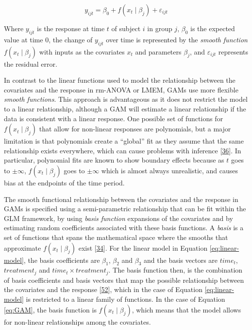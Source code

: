 \documentclass[
]{article}
\begin{document}
\begin{equation}
  y_{ijt}=\beta_0+f(x_t\mid \beta_j)+\varepsilon_{ijt}
  \label{eq:GAM}
\end{equation}

Where \(y_{ijt}\) is the response at time \(t\) of subject \(i\) in group \(j\), \(\beta_0\) is the expected value at time 0, the change of \(y_{ijt}\) over time is represented by the \emph{smooth function} \(f(x_t\mid \beta_j)\) with inputs as the covariates \(x_t\) and parameters \(\beta_j\), and \(\varepsilon_{ijt}\) represents the residual error.

In contrast to the linear functions used to model the relationship between the covariates and the response in rm-ANOVA or LMEM, GAMs use more flexible \emph{smooth functions}. This approach is advantageous as it does not restrict the model to a linear relationship, although a GAM will estimate a linear relationship if the data is consistent with a linear response. One possible set of functions for \(f(x_t\mid \beta_j)\) that allow for non-linear responses are polynomials, but a major limitation is that polynomials create a ``global'' fit as they assume that the same relationship exists everywhere, which can cause problems with inference {[}\protect\hyperlink{ref-beck1998}{36}{]}. In particular, polynomial fits are known to show boundary effects because as \(t\) goes to \(\pm \infty\), \(f(x_t \mid \beta_j)\) goes to \(\pm \infty\) which is almost always unrealistic, and causes bias at the endpoints of the time period.

The smooth functional relationship between the covariates and the response in GAMs is specified using a semi-parametric relationship that can be fit within the GLM framework, by using \emph{basis function} expansions of the covariates and by estimating random coefficients associated with these basis functions. A \emph{basis} is a set of functions that spans the mathematical space where the smooths that approximate \(f(x_t \mid \beta_j)\) exist {[}\protect\hyperlink{ref-simpson2018}{34}{]}. For the linear model in Equation \eqref{eq:linear-model}, the basis coefficients are \(\beta_1\), \(\beta_2\) and \(\beta_3\) and the basis vectors are \(time_t\), \(treatment_j\) and \(time_t \times treatment_j\). The basis function then, is the combination of basis coefficients and basis vectors that map the possible relationship between the covariates and the response {[}\protect\hyperlink{ref-hefley2017}{52}{]}, which in the case of Equation \eqref{eq:linear-model} is restricted to a linear family of functions. In the case of Equation \eqref{eq:GAM}, the basis function is \(f(x_t\mid \beta_j)\), which means that the model allows for non-linear relationships among the covariates.
\end{document}
